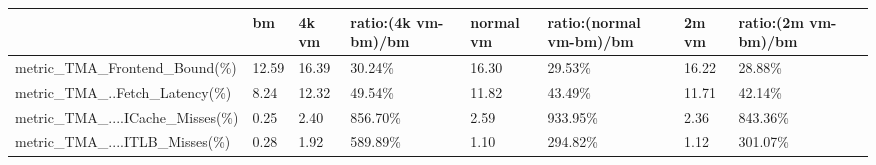\documentclass[12pt]{article}
\begin{document}
\begin{longtable}{|m{139.55pt}|m{40.35pt}|m{36.25pt}|m{36.25pt}|m{36.25pt}|m{42.10pt}|m{30.30pt}|m{44.65pt}|@{}m{0pt}@{}}
\hline
\raggedright\arraybackslash{} & \centering\arraybackslash{}bm & \centering\arraybackslash{}4k vm & \cellcolor[HTML]{D9D9D9}\centering\arraybackslash{}ratio:\newline{}(4k vm-bm)/bm & \centering\arraybackslash{}normal vm & \cellcolor[HTML]{D9D9D9}\centering\arraybackslash{}ratio:\newline{}(normal vm-bm)/bm & \centering\arraybackslash{}2m vm & \cellcolor[HTML]{D9D9D9}\centering\arraybackslash{}ratio:\newline{}(2m vm-bm)/bm & \rule[-0.00pt]{0pt}{40.45pt} \\ \hline \endfirsthead
\cellcolor[HTML]{F8CBAD}\raggedright\arraybackslash{}metric\_\allowbreak{}TMA\_\allowbreak{}Frontend\_\allowbreak{}Bound(\%) & \cellcolor[HTML]{F8CBAD}\centering\arraybackslash{}12.59 & \cellcolor[HTML]{F8CBAD}\centering\arraybackslash{}16.39 & \cellcolor[HTML]{F8CBAD}\centering\arraybackslash{}30.24\% & \cellcolor[HTML]{F8CBAD}\centering\arraybackslash{}16.30 & \cellcolor[HTML]{F8CBAD}\centering\arraybackslash{}29.53\% & \cellcolor[HTML]{F8CBAD}\centering\arraybackslash{}16.22 & \cellcolor[HTML]{F8CBAD}\centering\arraybackslash{}28.88\% & \rule[-0.00pt]{0pt}{14.40pt} \\ \hline
\raggedright\arraybackslash{}metric\_\allowbreak{}TMA\_\allowbreak{}..Fetch\_\allowbreak{}Latency(\%) & \centering\arraybackslash{}8.24 & \centering\arraybackslash{}12.32 & \cellcolor[HTML]{D9D9D9}\centering\arraybackslash{}49.54\% & \centering\arraybackslash{}11.82 & \cellcolor[HTML]{D9D9D9}\centering\arraybackslash{}43.49\% & \centering\arraybackslash{}11.71 & \cellcolor[HTML]{D9D9D9}\centering\arraybackslash{}42.14\% & \rule[-0.00pt]{0pt}{14.40pt} \\ \hline
\raggedright\arraybackslash{}metric\_\allowbreak{}TMA\_\allowbreak{}....ICache\_\allowbreak{}Misses(\%) & \centering\arraybackslash{}0.25 & \centering\arraybackslash{}2.40 & \cellcolor[HTML]{D9D9D9}\centering\arraybackslash{}856.70\% & \centering\arraybackslash{}2.59 & \cellcolor[HTML]{D9D9D9}\centering\arraybackslash{}933.95\% & \centering\arraybackslash{}2.36 & \cellcolor[HTML]{D9D9D9}\centering\arraybackslash{}843.36\% & \rule[-0.00pt]{0pt}{14.40pt} \\ \hline
\raggedright\arraybackslash{}metric\_\allowbreak{}TMA\_\allowbreak{}....ITLB\_\allowbreak{}Misses(\%) & \centering\arraybackslash{}0.28 & \centering\arraybackslash{}1.92 & \cellcolor[HTML]{D9D9D9}\centering\arraybackslash{}589.89\% & \centering\arraybackslash{}1.10 & \cellcolor[HTML]{D9D9D9}\centering\arraybackslash{}294.82\% & \centering\arraybackslash{}1.12 & \cellcolor[HTML]{D9D9D9}\centering\arraybackslash{}301.07\% & \rule[-0.00pt]{0pt}{14.40pt} \\ \hline

\end{longtable}
\end{document}
